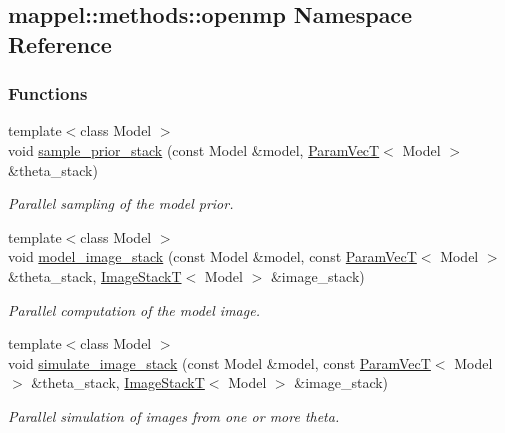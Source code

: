 \hypertarget{namespacemappel_1_1methods_1_1openmp}{}\subsection{mappel\+:\+:methods\+:\+:openmp Namespace Reference}
\label{namespacemappel_1_1methods_1_1openmp}
\subsubsection*{Functions}
\begin{DoxyCompactItemize}
\item 
{\footnotesize template$<$class Model $>$ }\\void \hyperlink{namespacemappel_1_1methods_1_1openmp_aecbee53826dbf135920ebe6532fb38cd}{sample\+\_\+prior\+\_\+stack} (const Model \&model, \hyperlink{namespacemappel_a0f86d3153e4e27b095012f140eea58de}{Param\+VecT}$<$ Model $>$ \&theta\+\_\+stack)
\begin{DoxyCompactList}\small\item\em Parallel sampling of the model prior. \end{DoxyCompactList}\item 
{\footnotesize template$<$class Model $>$ }\\void \hyperlink{namespacemappel_1_1methods_1_1openmp_a618f312f9e8b3a5d9972be5d755a7edb}{model\+\_\+image\+\_\+stack} (const Model \&model, const \hyperlink{namespacemappel_a0f86d3153e4e27b095012f140eea58de}{Param\+VecT}$<$ Model $>$ \&theta\+\_\+stack, \hyperlink{namespacemappel_a636dbe5b195c267a5f6a65cd48ff94a6}{Image\+StackT}$<$ Model $>$ \&image\+\_\+stack)
\begin{DoxyCompactList}\small\item\em Parallel computation of the model image. \end{DoxyCompactList}\item 
{\footnotesize template$<$class Model $>$ }\\void \hyperlink{namespacemappel_1_1methods_1_1openmp_a2db11e0e59544e0a4d3fc20a644c12ea}{simulate\+\_\+image\+\_\+stack} (const Model \&model, const \hyperlink{namespacemappel_a0f86d3153e4e27b095012f140eea58de}{Param\+VecT}$<$ Model $>$ \&theta\+\_\+stack, \hyperlink{namespacemappel_a636dbe5b195c267a5f6a65cd48ff94a6}{Image\+StackT}$<$ Model $>$ \&image\+\_\+stack)
\begin{DoxyCompactList}\small\item\em Parallel simulation of images from one or more theta. \end{DoxyCompactList}\item 

\end{DoxyCompactItemize}
